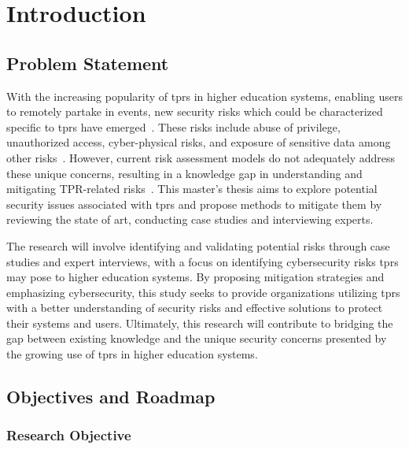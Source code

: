 
\newpage
\section{Introduction}


\subsection{Problem Statement}

With the increasing popularity of \ac{tprs} in higher education systems, enabling users to remotely partake in events, new security risks
which could be characterized specific to \ac{tprs} have emerged~\cite{acceptance_telepresence_robots_2022,
  cyber_security_issues_in_robotics_2021,robotics_cyber_security_2022,robot_security_review_2022}.
These risks include abuse of privilege, unauthorized access, cyber-physical risks, and exposure of sensitive data among other risks~\cite[
  120]{robotics_cyber_security_2022}.
However, current risk assessment models do not adequately address these unique concerns, resulting in a knowledge gap in understanding 
and mitigating TPR-related risks~\cite[]{robotics_cyber_security_2022}.
This master's thesis aims to explore potential security issues associated with \ac{tprs} and propose methods to mitigate them by
reviewing the state of art, conducting case studies and interviewing experts.

The research will involve identifying and validating potential risks through case studies and expert interviews, with a focus on identifying
cybersecurity risks \ac{tprs} may pose to higher education systems.
By proposing mitigation strategies and emphasizing cybersecurity, this study seeks to provide organizations utilizing \ac{tprs} with a
better
understanding of security risks and effective solutions to protect their systems and users.
Ultimately, this research will contribute to bridging the gap between existing knowledge and the unique security concerns presented by the
growing use of \ac{tprs} in higher education systems.

\subsection{Objectives and Roadmap}\label{subsec:objectives-and-roadmap}


\subsubsection{Research Objective}

